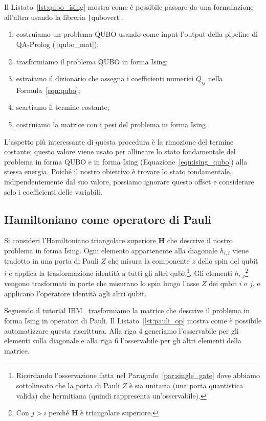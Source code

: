 Il Listato~\ref{lst:qubo_ising} mostra come è possibile passare da una formulazione all'altra usando la libreria \texttt|qubovert|:
\begin{enumerate}
	\item costruiamo un problema QUBO usando come input l'output della pipeline di QA-Prolog (\texttt|qubo_mat|);
	\item trasformiamo il problema QUBO in forma Ising;
	\item estraiamo il dizionario che assegna i coefficienti numerici $Q_{ij}$ nella Formula~\ref{eqn:qubo};
	\item scartiamo il termine costante;
	\item costruiamo la matrice con i pesi del problema in forma Ising.
\end{enumerate}
L'aspetto più interessante di questa procedura è la rimozione del termine costante; questo valore viene usato per allineare lo stato fondamentale del problema in forma QUBO e in forma Ising (Equazione~\ref{eqn:ising_qubo}) alla stessa energia. Poiché il nostro obiettivo è trovare lo stato fondamentale, indipendentemente dal suo valore, possiamo ignorare questo offset e considerare solo i coefficienti delle variabili.

\subsection{Hamiltoniano come operatore di Pauli}
Si consideri l'Hamiltoniano triangolare superiore $\mathbf{H}$ che descrive il nostro problema in forma Ising. Ogni elemento appartenente alla diagonale $h_{i,i}$ viene tradotto in una porta di Pauli $Z$ che misura la componente $z$ dello spin del qubit $i$ e applica la trasformazione identità a tutti gli altri qubit\footnote{Ricordando l'osservazione fatta nel Paragrafo~\ref{par:single_gate} dove abbiamo sottolineato che la porta di Pauli $Z$ è sia unitaria (una porta quantistica valida) che hermitiana (quindi rappresenta un'osservabile).}. Gli elementi $h_{i,j}$\footnote{Con $j>i$ perché $\mathbf{H}$ è triangolare superiore.} vengono trasformati in porte che misurano lo spin lungo l'asse $Z$ dei qubit $i$ e $j$, e applicano l'operatore identità agli altri qubit. 

Seguendo il tutorial IBM~\cite{ibm_qaoa_tutorial} trasformiamo la matrice che descrive il problema in forma Ising in operatori di Pauli. Il Listato~\ref{lst:pauli_op} mostra come è possibile automatizzare questa riscrittura. Alla riga $4$ generiamo l'osservabile per gli elementi sulla diagonale e alla riga $6$ l'osservabile per gli altri elementi della matrice.
\begin{listingenv}[h]
	\caption{Generazione dell'operatore di Pauli}
	\label{lst:pauli_op}
\end{listingenv}


